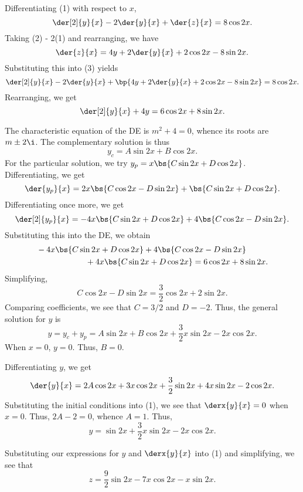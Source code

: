 \begin{solution}
    \begin{ppart}
        Differentiating (1) with respect to $x$, \[\der[2]{y}{x} - 2\der{y}{x} + \der{z}{x} = 8\cos{2x}.\] Taking (2) - 2(1) and rearranging, we have \[\der{z}{x} = 4y + 2\der{y}{x} + 2\cos{2x} - 8\sin{2x}.\] Substituting this into (3) yields \[\der[2]{y}{x} - 2\der{y}{x} + \bp{4y + 2\der{y}{x} + 2\cos{2x} - 8\sin{2x}} = 8\cos{2x}.\] Rearranging, we get \[\der[2]{y}{x} + 4y = 6\cos{2x} + 8\sin{2x}.\]
    \end{ppart}
    \begin{ppart}
        The characteristic equation of the DE is $m^2 + 4 = 0$, whence its roots are $m \pm 2\i$. The complementary solution is thus \[y_c = A\sin{2x} + B\cos{2x}.\] For the particular solution, we try $y_p = x\bs{C\sin{2x} + D\cos{2x}}$. Differentiating, we get \[\der{y_p}{x} = 2x\bs{C\cos{2x} - D\sin{2x}} + \bs{C\sin{2x} + D\cos{2x}}.\] Differentiating once more, we get \[\der[2]{y_p}{x} = -4x\bs{C\sin{2x} + D\cos{2x}} + 4\bs{C\cos{2x} - D\sin{2x}}.\] Substituting this into the DE, we obtain
        \begin{align*}
            &-4x\bs{C\sin{2x} + D\cos{2x}} + 4\bs{C\cos{2x} - D\sin{2x}}\\
            &\hspace{6em}+4x\bs{C\sin{2x} + D\cos{2x}} = 6\cos{2x} + 8\sin{2x}.
        \end{align*}
        Simplifying, \[C\cos{2x} - D\sin{2x} = \frac32 \cos{2x} + 2\sin{2x}.\] Comparing coefficients, we see that $C = 3/2$ and $D = -2$. Thus, the general solution for $y$ is \[y = y_c + y_p = A\sin{2x} + B\cos{2x} + \frac32 x \sin{2x} -2 x \cos{2x}.\] When $x = 0$, $y = 0$. Thus, $B = 0$. 
        
        Differentiating $y$, we get \[\der{y}{x} = 2A\cos{2x} + 3x\cos{2x} + \frac32 \sin{2x} + 4x\sin{2x} - 2\cos{2x}.\] Substituting the initial conditions into (1), we see that $\derx{y}{x} = 0$ when $x = 0$. Thus, $2A - 2 = 0$, whence $A = 1$. Thus, \[y = \sin{2x} + \frac32 x \sin{2x} -2 x \cos{2x}.\]

        Substituting our expressions for $y$ and $\derx{y}{x}$ into (1) and simplifying, we see that \[z = \frac92 \sin{2x} - 7x\cos{2x} - x\sin{2x}.\]
    \end{ppart}
\end{solution}